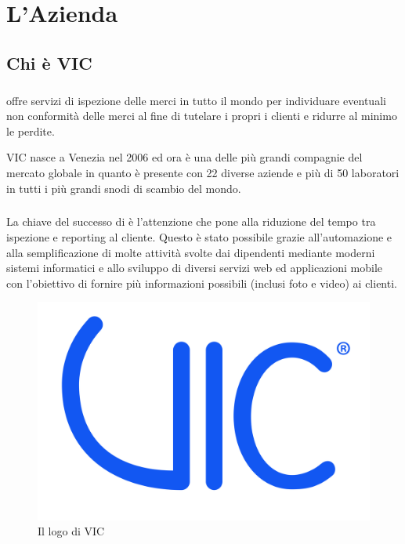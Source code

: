
\chapter{L'Azienda}
\label{cap:azienda}



\section{Chi è VIC} %
	\paragraph{} 
	\vic{}\cite{site:vic} offre servizi di ispezione delle merci in tutto il mondo per individuare eventuali non conformità delle merci al fine di tutelare i propri i clienti e ridurre al minimo le perdite.
	
	VIC nasce a Venezia nel 2006 ed ora è una delle più grandi compagnie del mercato globale in quanto 
	è presente con 22 diverse aziende e più di 50 laboratori in tutti i più grandi snodi di scambio del mondo.
	
	\paragraph{} La chiave del successo di \vic{} è l'attenzione che pone alla riduzione del tempo tra ispezione e reporting al cliente. 
	Questo è stato possibile grazie all'automazione e alla semplificazione di molte attività svolte dai dipendenti mediante moderni sistemi
	informatici e allo sviluppo di diversi servizi web ed applicazioni mobile con l’obiettivo di fornire più informazioni possibili (inclusi foto e video) ai clienti.
	
	
	\begin{figure}[H]
		\centering
		\includegraphics[width=0.5\linewidth]{immagini/logo-vic}
		\caption{Il logo di VIC}
		\label{fig:logo-vic}
	\end{figure}
	 

